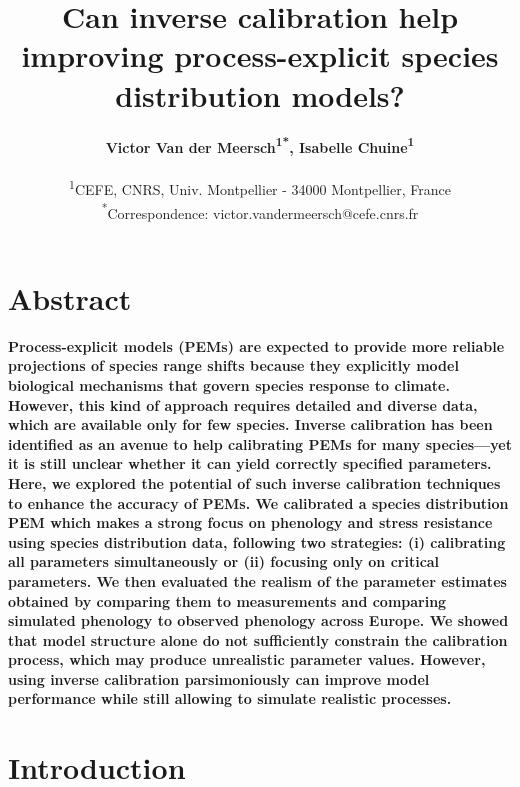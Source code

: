 \documentclass[letterpaper,8pt]{extarticle}  %
\title{Can inverse calibration help improving process-explicit species distribution models?}
\author{%
\textbf{Victor Van der Meersch\textcolor{Accent}{\textsuperscript{1*}}, %
Isabelle Chuine\textcolor{Accent}{\textsuperscript{1}} %
}\\
\begin{small}\textcolor{Accent}{\textsuperscript{1}}CEFE, CNRS, Univ. Montpellier - 34000 Montpellier, France \\ 
\textcolor{Accent}{\textsuperscript{*}}Correspondence: \textcolor{Accent}{victor.vandermeersch@cefe.cnrs.fr} \\ \end{small}
}
\date{}
\begin{document}
\maketitle

\section*{Abstract}

\begin{doublespacing}
\begin{linenumbers}

\noindent
\textbf{
Process-explicit models (PEMs) are expected to provide more reliable projections of species range shifts because they explicitly model biological mechanisms that govern species response to climate.
However, this kind of approach requires detailed and diverse data, which are available only for few species. 
Inverse calibration has been identified as an avenue to help calibrating PEMs for many species---yet it is still unclear whether it can yield correctly specified parameters.
Here, we explored the potential of such inverse calibration techniques to enhance the accuracy of PEMs. We calibrated a species distribution PEM which makes a strong focus on phenology and stress resistance using species distribution data, following two strategies: (i) calibrating all parameters simultaneously or (ii) focusing only on critical parameters. We then evaluated the realism of the parameter estimates obtained by comparing them to measurements and comparing simulated phenology to observed phenology across Europe. 
We showed that model structure alone do not sufficiently constrain the calibration process, which may produce unrealistic parameter values. However, using inverse calibration parsimoniously can improve model performance while still allowing to simulate realistic processes.
}

\section{Introduction}



\end{linenumbers}
\end{doublespacing}
\end{document}
